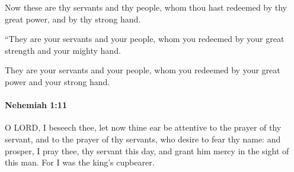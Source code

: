 			\begin{versebox}
					\item[BHS] 
					\item[LXX] 
					\item[ASV] Now these are thy servants and thy people, whom thou hast redeemed by thy great power, and by thy strong hand.
					\item[NIV] “They are your servants and your people, whom you redeemed by your great strength and your mighty hand.
					\item[NRSV] They are your servants and your people, whom you redeemed by your great power and your strong hand.
			\end{versebox}

		\paragraph{Nehemiah 1:11} %
			\label{NEHEMIAH-1-11}

			O LORD, I beseech thee, let now thine ear be attentive to the prayer of thy servant, and to the prayer of thy servants, who desire to fear thy name: and prosper, I pray thee, thy servant this day, and grant him mercy in the sight of this man. For I was the king’s cupbearer.

